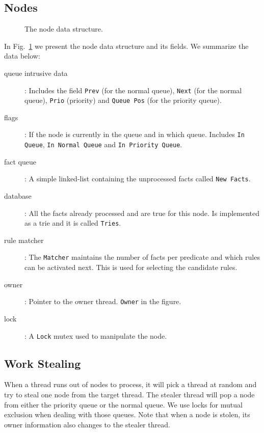 \subsection{Nodes}

\begin{figure}[h!]
     \centering
    \caption{The node data structure.}
    \label{fig:node}
\end{figure}

In Fig.~\ref{fig:node} we present the node data structure and its fields. We summarize the data below:

\begin{description}
   \item[queue intrusive data]: Includes the field \texttt{Prev} (for the normal queue), \texttt{Next} (for the normal queue), \texttt{Prio} (priority) and \texttt{Queue Pos} (for the priority queue).
   \item[flags]: If the node is currently in the queue and in which queue. Includes \texttt{In Queue}, \texttt{In Normal Queue} and \texttt{In Priority Queue}.
   \item[fact queue]: A simple linked-list containing the unprocessed facts called \texttt{New Facts}.
   \item[database]: All the facts already processed and are true for this node. Is implemented as a trie and it is called \texttt{Tries}.
   \item[rule matcher]: The \texttt{Matcher} maintains the number of facts per predicate and which rules can be activated next. This is used for selecting the candidate rules.
   \item[owner]: Pointer to the owner thread. \texttt{Owner} in the figure.
   \item[lock]: A \texttt{Lock} mutex used to manipulate the node.
\end{description}

\subsection{Work Stealing}

When a thread runs out of nodes to process, it will pick a thread at random and try to steal one node
from the target thread. The stealer thread will pop a node from either the priority queue or the normal queue. We use locks for mutual exclusion when dealing with those queues. Note that when a
node is stolen, its owner information also changes to the stealer thread.

